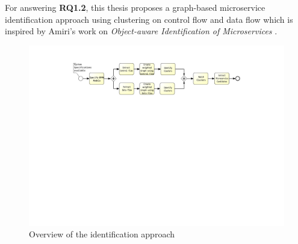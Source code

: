 \noindent
For answering \textbf{RQ1.2}, this thesis proposes a graph-based microservice identification approach using clustering on control flow and data flow which is  inspired by Amiri’s work on \textit{Object-aware Identification of Microservices} \cite{ObjectAwareAmiri}. \\



\begin{figure}[h!]
	\includegraphics[width=\textwidth, trim={7.5cm 15.3cm 5.0cm 1.5cm}]{img/ThesisProcess.pdf}
	\caption{Overview of the identification approach}
	\label{fig:thesisProcess}
\end{figure}


